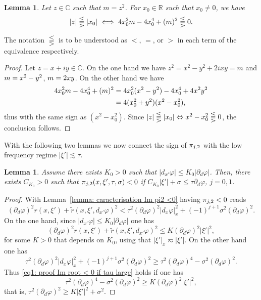 \documentclass[JEP,XML,SOM,Unicode,published]{cedram}
\theoremstyle{plain}
\newtheorem{lemma}[theorem]{Lemma}
\theoremstyle{definition}
\def\R{\mathbb{R}}
\def\C{\mathbb{C}}
\let \Re \relax
\DeclareMathOperator{\Re}{Re}
\let \Im \relax
\DeclareMathOperator{\Im}{Im}
\begin{document}
\begin{lemma}
\label{lem1}
Let $z\in\C$ such that $m=z^2$. For $x_0\in\R$ such
that $x_0\neq 0$, we have
\begin{equation*}
|\Re z|\lesseqqgtr |x_0|
\iff
4x_0^2 \Re m-4x_0^4+(\Im m)^2
\lesseqqgtr0.
\end{equation*}
\end{lemma}
The notation $\lesseqqgtr$ is to be understood as $<$, $=$, or $>$
in each term of the equivalence respectively.
\begin{proof}
Let $z=x+iy\in\C$. On the one hand we have
$z^2=x^2-y^2+2ixy=m$ and $\Re m=x^2-y^2$, $\Im m=2xy$. On the other
hand we have
\begin{align*}
4x_0^2\Re m-4x_0^4+(\Im m)^2
&=4x_0^2(x^2-y^2)-4x_0^4+4x^2y^2\\
&=4(x_0^2+y^2)(x^2-x_0^2),
\end{align*}
thus with the same sign as $(x^2-x_0^2)$.
Since $|\Re z|\lesseqqgtr |x_0| \Leftrightarrow x^2-x_0^2 \lesseqqgtr 0$, the conclusion follows.
\end{proof}

With the following two lemmas we now connect the sign of $\Im \pi_{j,2}$ with the low frequency
regime $|\xi'| \lesssim \tau$.

\begin{lemma}
\label{lemma: Im root < 0 if tau large}
Assume there exists $K_0 >0$ such that $|d_{x'} \varphi| \leq K_0 |\partial_d
\varphi|$. Then, there exists $C_{K_0}>0$ such that $\Im \pi_{j,2} (x,\xi',\tau,\sigma) <0$
if $C_{K_0} |\xi'| + \sigma \leq \tau \partial_d \varphi$, $j=0,1$.
\end{lemma}
\begin{proof}
With Lemma~\ref{lemma: caracterisation Im pi2 <0} having $\Im
\pi_{j,2} <0$ reads
\begin{equation}
\label{eq1: proof Im root < 0 if tau large}
(\partial_d\varphi)^2r(x,\xi')+\tilde{r}(x,\xi',d_{x'}\varphi)^2
<\tau^2(\partial_d\varphi)^2|d_x\varphi|_x^2+(-1)^{j+1}\sigma^2(\partial_d\varphi)^2.
\end{equation}
On the one hand, since $|d_{x'} \varphi| \leq K_0 |\partial_d
\varphi|$ one has
\begin{equation*}
(\partial_d\varphi)^2r(x,\xi')+\tilde{r}(x,\xi',d_{x'}\varphi)^2
\leq K (\partial_d\varphi)^2 |\xi'|^2,
\end{equation*}
for some $K>0$ that depends on $K_0$, using that $|\xi'|_x \eqsim
|\xi'|$.
On the other hand one has
\begin{equation*}
\tau^2(\partial_d\varphi)^2|d_x\varphi|_x^2+(-1)^{j+1}\sigma^2(\partial_d\varphi)^2
\geq \tau^2 (\partial_d\varphi)^4 - \sigma^2(\partial_d\varphi)^2.
\end{equation*}
Thus \eqref{eq1: proof Im root < 0 if tau large} holds if one has
\begin{equation*}
\tau^2 (\partial_d\varphi)^4
- \sigma^2(\partial_d\varphi)^2
\geq K (\partial_d\varphi)^2 |\xi'|^2,
\end{equation*}
that is, $\tau^2 (\partial_d\varphi)^2 \geq K |\xi'|^2
+ \sigma^2$.
\end{proof}
\end{document}
